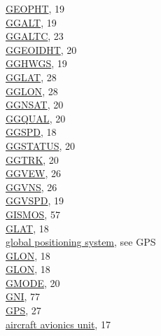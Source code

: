 \documentclass[
]{book}
\begin{document}
\href{./3-the-state-of-the-aircraft.html\#geopth}{GEOPHT}, 19\\
\href{./3-the-state-of-the-aircraft.html\#ggalt}{GGALT}, 19\\
\href{./3-the-state-of-the-aircraft.html\#altx}{GGALTC}, 23\\
\href{./3-the-state-of-the-aircraft.html\#ggeoidht}{GGEOIDHT}, 20\\
\href{./3-the-state-of-the-aircraft.html\#gghwgs}{GGHWGS}, 19\\
\href{./3-the-state-of-the-aircraft.html\#gglat}{GGLAT}, 28\\
\href{./3-the-state-of-the-aircraft.html\#gglon}{GGLON}, 28\\
\href{./3-the-state-of-the-aircraft.html\#ggnsat}{GGNSAT}, 20\\
\href{./3-the-state-of-the-aircraft.html\#ggqual}{GGQUAL}, 20\\
\href{./3-the-state-of-the-aircraft.html\#ggspd}{GGSPD}, 18\\
\href{./3-the-state-of-the-aircraft.html\#ggstatus\%7C}{GGSTATUS}, 20\\
\href{./3-the-state-of-the-aircraft.html\#ggtrk}{GGTRK}, 20\\
\href{./3-the-state-of-the-aircraft.html\#ggvew}{GGVEW}, 26\\
\href{./3-the-state-of-the-aircraft.html\#ggvns}{GGVNS}, 26\\
\href{./3-the-state-of-the-aircraft.html\#ggvspd}{GGVSPD}, 19\\
\href{./3-the-state-of-the-aircraft.html\#special-use-remote}{GISMOS}, 57\\
\href{./3-the-state-of-the-aircraft.html\#gglat}{GLAT}, 18\\
\href{./3-the-state-of-the-aircraft.html\#global-positioning-systems}{global positioning system}, see GPS\\
\href{./3-the-state-of-the-aircraft.html\#gglon}{GLON}, 18\\
\href{./3-the-state-of-the-aircraft.html\#gglon}{GLON}, 18\\
\href{./3-the-state-of-the-aircraft.html\#gmode}{GMODE}, 20\\
\href{./7-aerosol-particle-measurements.html\#special-aerosol}{GNI}, 77\\
\href{./3-the-state-of-the-aircraft.html\#global-positioning-systems}{GPS}, 27\\
\hspace*{0.333em}\hspace*{0.333em}\href{./3-the-state-of-the-aircraft.html\#gglat}{aircraft avionics unit}, 17\\
\end{document}
